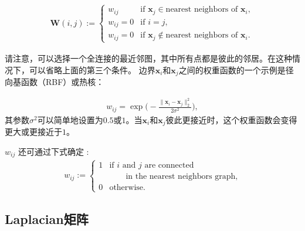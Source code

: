 \documentclass[lang=cn,10pt]{gorgeousnbook}
\numberwithin{equation}{section}%
\numberwithin{figure}{section}%
\begin{document}
\begin{align}\label{equation_adjacency_matrix}
\boldsymbol{W}(i,j) := 
\left\{
    \begin{array}{ll}
        w_{ij} & \mbox{if } \boldsymbol{x}_j \in \text{nearest neighbors of } \boldsymbol{x}_i, \\
        w_{ij} = 0 & \mbox{if } i = j, \\
        w_{ij} = 0 & \mbox{if } \boldsymbol{x}_j \not\in \text{nearest neighbors of } \boldsymbol{x}_i.
    \end{array}
\right.
\end{align}

请注意，可以选择一个全连接的最近邻图，其中所有点都是彼此的邻居。在这种情况下，可以省略上面的第三个条件\cite{ng2001spectral}。
边界$\boldsymbol{x}_i$和$\boldsymbol{x}_j$之间的权重函数的一个示例是径向基函数（RBF）或热核\cite{belkin2001laplacian}：

\begin{align}\label{equation_RBF_kernel}
w_{ij} = \exp\Big(\!\!-\frac{\|\boldsymbol{x}_i - \boldsymbol{x}_j\|_2^2}{2 \sigma^2}\Big),
\end{align}
其参数$\sigma^2$可以简单地设置为$0.5$或$1$。当$\boldsymbol{x}_i$和$\boldsymbol{x}_j$彼此更接近时，这个权重函数会变得更大或更接近于$1$。

$w_{ij}$ 还可通过下式确定 \cite{belkin2001laplacian}:
\begin{align}\label{equation_simple_minded}
w_{ij} := 
\left\{
    \begin{array}{ll}
        1 & \mbox{if } i \text{ and } j \text{ are connected} \\
        & \quad \quad \text{in the nearest neighbors graph}, \\
        0 & \mbox{otherwise. } 
    \end{array}
\right.
\end{align}


\subsection{Laplacian矩阵}\label{section_Laplacian_matrix_definition}
\end{document}
